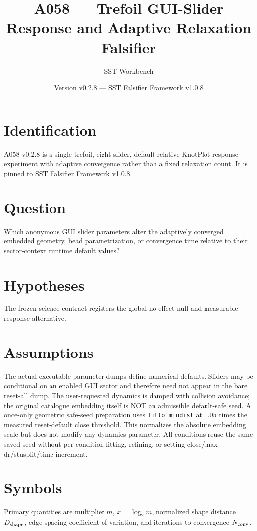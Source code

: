 \documentclass[11pt,a4paper]{article}
\begin{document}
\title{A058 --- Trefoil GUI-Slider Response and Adaptive Relaxation Falsifier}
\author{SST-Workbench}\date{Version v0.2.8 --- SST Falsifier Framework v1.0.8}\maketitle
{}
\section{Identification}
A058 v0.2.8 is a single-trefoil, eight-slider, default-relative KnotPlot response experiment with adaptive convergence rather than a fixed relaxation count. It is pinned to SST Falsifier Framework v1.0.8.
\section{Question}
Which anonymous GUI slider parameters alter the adaptively converged embedded geometry, bead parametrization, or convergence time relative to their sector-context runtime default values?
\section{Hypotheses}
The frozen science contract registers the global no-effect null and measurable-response alternative.
\section{Assumptions}
The actual executable parameter dumps define numerical defaults. Sliders may be conditional on an enabled GUI sector and therefore need not appear in the bare reset-all dump. The user-requested dynamics is damped with collision avoidance; the original catalogue embedding itself is NOT an admissible default-safe seed. A once-only geometric safe-seed preparation uses \texttt{fitto mindist} at $1.05$ times the measured reset-default close threshold. This normalizes the absolute embedding scale but does not modify any dynamics parameter. All conditions reuse the same saved seed without per-condition fitting, refining, or setting close/max-dr/stusplit/time increment.
\section{Symbols}
Primary quantities are multiplier $m$, $x=\log_2m$, normalized shape distance $D_{\rm shape}$, edge-spacing coefficient of variation, and iterations-to-convergence $N_{\rm conv}$.
\end{document}
